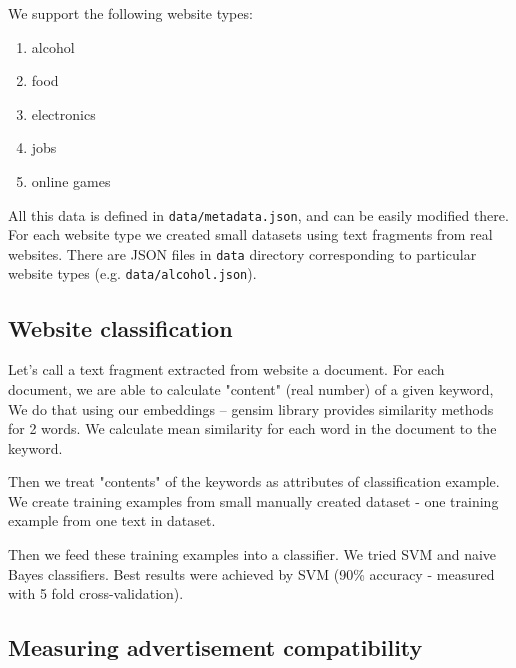 \documentclass[a4paper]{article}
\begin{document}
We support the following website types:
\begin{enumerate}
    \item alcohol
    \item food
    \item electronics
    \item jobs
    \item online games
\end{enumerate}

All this data is defined in \texttt{data/metadata.json}, and can be easily modified there.
For each website type we created small datasets using text fragments from real websites.
There are JSON files in \texttt{data} directory corresponding to particular website types
(e.g. \texttt{data/alcohol.json}).


\subsection{Website classification}

Let's call a text fragment extracted from website a document.
For each document, we are able to calculate "content" (real number) of a given keyword,
We do that using our embeddings -- gensim library provides similarity methods for 2 words.
We calculate mean similarity for each word in the document to the keyword.

Then we treat "contents" of the keywords as attributes of classification example.
We create training examples from small manually created dataset - one training example from one text in dataset.

Then we feed these training examples into a classifier.
We tried SVM and naive Bayes classifiers.
Best results were achieved by SVM (90\% accuracy - measured with 5 fold cross-validation).

\subsection{Measuring advertisement compatibility}
\label{mainlogic}
\end{document}

